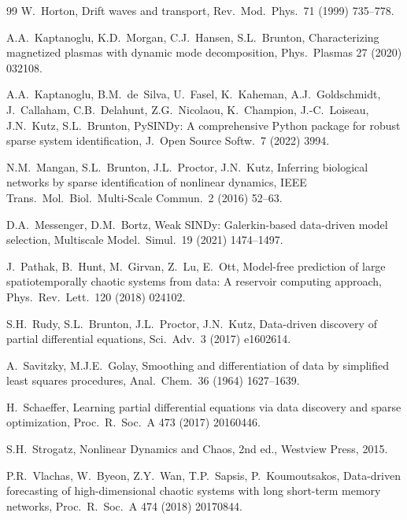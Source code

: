 \documentclass[12pt]{article}
\begin{document}
\begin{thebibliography}{99}
W.~Horton,
Drift waves and transport,
Rev.\ Mod.\ Phys.\ 71 (1999) 735--778.

A.A.~Kaptanoglu, K.D.~Morgan, C.J.~Hansen, S.L.~Brunton,
Characterizing magnetized plasmas with dynamic mode decomposition,
Phys.\ Plasmas 27 (2020) 032108.

A.A.~Kaptanoglu, B.M.~de~Silva, U.~Fasel, K.~Kaheman, A.J.~Goldschmidt, J.~Callaham, C.B.~Delahunt, Z.G.~Nicolaou, K.~Champion, J.-C.~Loiseau, J.N.~Kutz, S.L.~Brunton,
{PySINDy}: A comprehensive {P}ython package for robust sparse system identification,
J.\ Open Source Softw.\ 7 (2022) 3994.

N.M.~Mangan, S.L.~Brunton, J.L.~Proctor, J.N.~Kutz,
Inferring biological networks by sparse identification of nonlinear dynamics,
IEEE Trans.\ Mol.\ Biol.\ Multi-Scale Commun.\ 2 (2016) 52--63.

D.A.~Messenger, D.M.~Bortz,
Weak {SINDy}: Galerkin-based data-driven model selection,
Multiscale Model.\ Simul.\ 19 (2021) 1474--1497.

J.~Pathak, B.~Hunt, M.~Girvan, Z.~Lu, E.~Ott,
Model-free prediction of large spatiotemporally chaotic systems from data: A reservoir computing approach,
Phys.\ Rev.\ Lett.\ 120 (2018) 024102.

S.H.~Rudy, S.L.~Brunton, J.L.~Proctor, J.N.~Kutz,
Data-driven discovery of partial differential equations,
Sci.\ Adv.\ 3 (2017) e1602614.

A.~Savitzky, M.J.E.~Golay,
Smoothing and differentiation of data by simplified least squares procedures,
Anal.\ Chem.\ 36 (1964) 1627--1639.

H.~Schaeffer,
Learning partial differential equations via data discovery and sparse optimization,
Proc.\ R.\ Soc.\ A 473 (2017) 20160446.

S.H.~Strogatz,
Nonlinear Dynamics and Chaos, 2nd ed., Westview Press, 2015.

P.R.~Vlachas, W.~Byeon, Z.Y.~Wan, T.P.~Sapsis, P.~Koumoutsakos,
Data-driven forecasting of high-dimensional chaotic systems with long short-term memory networks,
Proc.\ R.\ Soc.\ A 474 (2018) 20170844.

\end{thebibliography}
\end{document}
